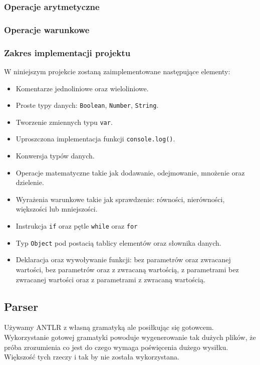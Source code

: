 \documentclass[a4paper]{article}
\begin{document}
\subsubsection{Operacje arytmetyczne}
\subsubsection{Operacje warunkowe}
\subsubsection{Zakres implementacji projektu}
W niniejszym projekcie zostaną zaimplementowane następujące elementy: 
\begin{itemize}
  \item Komentarze jednoliniowe oraz wieloliniowe.
  \item Proste typy danych: \texttt{Boolean}, \texttt{Number}, \texttt{String}.
  \item Tworzenie zmiennych typu \texttt{var}.
  \item Uproszczona implementacja funkcji \texttt{console.log()}.
  \item Konwersja typów danych.
  \item Operacje matematyczne takie jak dodawanie, odejmowanie, mnożenie oraz dzielenie.
  \item Wyrażenia warunkowe takie jak sprawdzenie: równości, nierówności, większości lub mniejszości.
  \item Instrukcja \texttt{if} oraz pętle \texttt{while} oraz \texttt{for}
  \item Typ \texttt{Object} pod postacią tablicy elementów oraz słownika danych.
  \item Deklaracja oraz wywoływanie funkcji: bez parametrów oraz zwracanej wartości, bez parametrów oraz z zwracaną wartością, z parametrami bez zwracanej wartości oraz z parametrami z zwracaną wartością.
\end{itemize}


\subsection{Parser}
Używamy ANTLR z własną gramatyką ale posiłkując się gotowcem. Wykorzystanie gotowej gramatyki powoduje wygenerowanie tak dużych plików, że próba zrozumienia co jest do czego wymaga poświęcenia dużego wysiłku. Większość tych rzeczy i tak by nie została wykorzystana.
\end{document}
